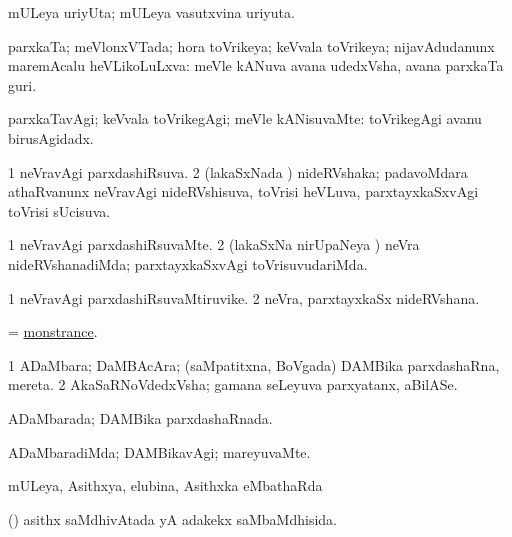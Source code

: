 \bentry
{}
\gl{\nA}
\bmng
mULeya uriyUta; mULeya vasutxvina uriyuta. 
\emng
\eentry

\bentry
{}
\gl{\gu}
\bmng
parxkaTa; meVlonxVTada; hora toVrikeya; keVvala toVrikeya; nijavAdudanunx maremAcalu heVLikoLuLxva:  meVle kANuva avana udedxVsha, avana parxkaTa guri. 
\emng
\eentry

\bentry
{}
\gl{\kirxvi}
\bmng
parxkaTavAgi; keVvala toVrikegAgi; meVle kANisuvaMte:  toVrikegAgi avanu birusAgidadx. 
\emng
\eentry

\bentry
{}
\gl{\gu}
\bmng
\bnum
\num{1} neVravAgi parxdashiRsuva. 
\num{2} (lakaSxNada \vi) nideRVshaka; padavoMdara athaRvanunx neVravAgi nideRVshisuva, toVrisi heVLuva, parxtayxkaSxvAgi toVrisi sUcisuva. 
\enum
\emng
\eentry

\bentry
{}
\gl{\kirxvi}
\bmng
\bnum
\num{1} neVravAgi parxdashiRsuvaMte. 
\num{2} (lakaSxNa nirUpaNeya \vi) neVra nideRVshanadiMda; parxtayxkaSxvAgi toVrisuvudariMda. 
\enum
\emng
\eentry

\bentry
{}
\gl{\nA}
\bmng
\bnum
\num{1} neVravAgi parxdashiRsuvaMtiruvike. 
\num{2} neVra, parxtayxkaSx nideRVshana. 
\enum
\emng
\eentry

\bentry
{}
\gl{\nA}
\bmng
= \hyperref{kandict_m.pdf}{M}{monstrance}{monstrance}. 
\emng
\eentry

\bentry
{}
\gl{\nA}
\bmng
\bnum
\num{1} ADaMbara; DaMBAcAra; (saMpatitxna, BoVgada) DAMBika parxdashaRna, mereta. 
\num{2} AkaSaRNoVdedxVsha; gamana seLeyuva parxyatanx, aBilASe. 
\enum
\emng
\eentry

\bentry
{}
\gl{\gu}
\bmng
ADaMbarada; DAMBika parxdashaRnada. 
\emng
\eentry

\bentry
{}
\gl{\kirxvi}
\bmng
ADaMbaradiMda; DAMBikavAgi; mareyuvaMte. 
\emng
\eentry

\bentry
{}
\gl{\sapUpa}
\bmng
mULeya, Asithxya, elubina, Asithxka eMbathaRda \sapUpa 
\emng
\eentry

\bentry
{}
\gl{\gu}
\bmng
(\veYshA) asithx saMdhivAtada yA adakekx saMbaMdhisida. 
\emng
\eentry

